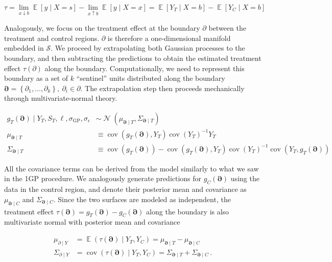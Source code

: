 \documentclass[letter]{article}
\newcommand{\genericdel}[3]{%
      \left#1#3\right#2
    }
\newcommand{\del}[1]{\genericdel(){#1}}
\newcommand{\sbr}[1]{\genericdel[]{#1}}
\newcommand{\cbr}[1]{\genericdel\{\}{#1}}
\DeclareMathOperator{\E}{\mathbb{E}}
\DeclareMathOperator{\cov}{{cov}}
\DeclareMathOperator{\normal}{\mathcal{N}}
\newcommand{\scrS}{\mathscr{S}}
\newcommand{\sigmaf}{\sigma_{\mathrm{GP}}}
\newcommand{\sigman}{\sigma_{\epsilon}}
\newcommand{\boundary}{\partial}
\newcommand{\sentinels}{\bm{\boundary}}
\begin{document}
\begin{equation}
\tau = \lim_{x \downarrow b} \E\sbr{y \mid X=s} - \lim_{x \uparrow b} \E\sbr{y \mid X=x} = \E\sbr{Y_T \mid X=b} - \E\sbr{Y_C \mid X=b}
\end{equation}

Analogously, we focus on the treatment effect at the boundary
\(\boundary\) between the treatment and control regions. \(\boundary\)
is therefore a one-dimensional manifold embedded in \(\scrS\). We
proceed by extrapolating both Gaussian processes to the boundary, and
then subtracting the predictions to obtain the estimated treatment
effect \(\tau(\boundary)\) along the boundary. Computationally, we need
to represent this boundary as a set of \(k\) ``sentinel'' units
distributed along the boundary
\(\sentinels=\cbr{\boundary_1,\ldots,\boundary_k},~\partial_i \in \partial\).
The extrapolation step then proceeds mechanically through
multivariate-normal theory.

\begin{equation}\begin{split}
    g_T(\sentinels) \mid Y_T, S_T, \ell, \sigmaf, \sigman &\sim \normal\del{\mu_{\sentinels \mid T}, \Sigma_{\sentinels \mid T}} \\
    \mu_{\sentinels \mid T} &\equiv \cov\del{g_T(\sentinels), Y_T} \cov\del{Y_T}^{-1}  Y_T \\
    \Sigma_{\sentinels \mid T} &\equiv \cov \del{g_T(\sentinels)} - \cov\del{g_T(\sentinels), Y_T} \cov\del{Y_T}^{-1} \cov\del{Y_T,g_T(\sentinels) \label{eq:postvarT2gp}
    }
\end{split}\end{equation}

All the covariance terms can be derived from the model similarly to what
we saw in the 1GP procedure. We analogously generate predictions for
\(g_C(\sentinels)\) using the data in the control region, and denote
their posterior mean and covariance as \(\mu_{\sentinels \mid C}\) and
\(\Sigma_{\sentinels \mid C}\). Since the two surfaces are modeled as
independent, the treatment effect
\(\tau(\sentinels)=g_T(\sentinels)-g_C(\sentinels)\) along the boundary
is also multivariate normal with posterior mean and covariance

\begin{equation}\begin{split}
    \mu_{\boundary \mid Y} &= \E \del{\tau(\sentinels) \mid Y_T, Y_C} = \mu_{\sentinels \mid T} - \mu_{\sentinels \mid C} \\
    \Sigma_{\boundary \mid Y} &= \cov\del{\tau(\sentinels) \mid Y_T, Y_C} = \Sigma_{\sentinels \mid T} + \Sigma_{\sentinels \mid C}\,.
\end{split}\label{eq:postvar2gp}\end{equation}
    
\end{document}
